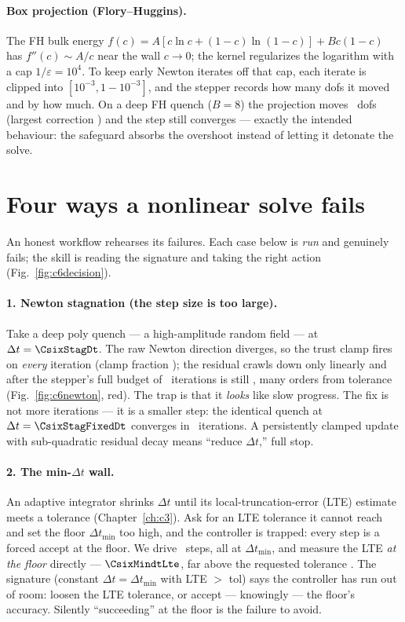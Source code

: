 \paragraph{Box projection (Flory--Huggins).} The FH bulk energy
$f(c)=A[c\ln c+(1-c)\ln(1-c)]+Bc(1-c)$ has $f''(c)\sim A/c$ near the wall
$c\to0$; the kernel regularizes the logarithm with a cap $1/\varepsilon=10^4$.
To keep early Newton iterates off that cap, each iterate is clipped into
$[10^{-3},1-10^{-3}]$, and the stepper records how many dofs it moved and by
how much. On a deep FH quench ($B=8$) the projection moves \CsixSafeProjDofs\
dofs (largest correction \CsixSafeProjMax) and the step still converges ---
exactly the intended behaviour: the safeguard absorbs the overshoot instead of
letting it detonate the solve.

\section{Four ways a nonlinear solve fails}

An honest workflow rehearses its failures. Each case below is \emph{run} and
genuinely fails; the skill is reading the signature and taking the right
action (Fig.~\ref{fig:c6decision}).

\paragraph{1. Newton stagnation (the step size is too large).} Take a deep poly
quench --- a high-amplitude random field --- at $\Delta t=\CsixStagDt$. The raw
Newton direction diverges, so the trust clamp fires on \emph{every} iteration
(clamp fraction \CsixStagClampFrac); the residual crawls down only linearly and
after the stepper's full budget of \CsixStagIters\ iterations is still
\CsixStagResFinal, many orders from tolerance (Fig.~\ref{fig:c6newton}, red).
The trap is that it \emph{looks} like slow progress. The fix is not more
iterations --- it is a smaller step: the identical quench at
$\Delta t=\CsixStagFixedDt$ converges in \CsixStagFixedIters\ iterations. A
persistently clamped update with sub-quadratic residual decay means ``reduce
$\Delta t$,'' full stop.

\paragraph{2. The min-$\Delta t$ wall.} An adaptive integrator shrinks
$\Delta t$ until its local-truncation-error (LTE) estimate meets a tolerance
(Chapter~\ref{ch:c3}). Ask for an LTE tolerance it cannot reach and set the
floor $\Delta t_{\min}$ too high, and the controller is trapped: every step is
a forced accept at the floor. We drive \CsixMindtSteps\ steps, all at
$\Delta t_{\min}$, and measure the LTE \emph{at the floor} directly ---
$\CsixMindtLte$, far above the requested tolerance \CsixMindtTol. The
signature (constant $\Delta t=\Delta t_{\min}$ with LTE $>$ tol) says the
controller has run out of room: loosen the LTE tolerance, or accept ---
knowingly --- the floor's accuracy. Silently ``succeeding'' at the floor is the
failure to avoid.

